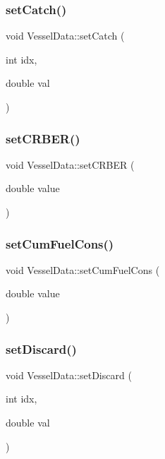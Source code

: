 \mbox{\label{class_vessel_data_aed1a3ec8e7eae38dd0f384b94a47147b}} 
\subsubsection{\texorpdfstring{setCatch()}{setCatch()}}
{\footnotesize\ttfamily void Vessel\+Data\+::set\+Catch (\begin{DoxyParamCaption}\item[{int}]{idx,  }\item[{double}]{val }\end{DoxyParamCaption})}

\mbox{\label{class_vessel_data_a07ae8da4d91f9839f348bd7996aba7c9}} 
\subsubsection{\texorpdfstring{setCRBER()}{setCRBER()}}
{\footnotesize\ttfamily void Vessel\+Data\+::set\+C\+R\+B\+ER (\begin{DoxyParamCaption}\item[{double}]{value }\end{DoxyParamCaption})}

\mbox{\label{class_vessel_data_a73f432263d3c69ee879232b8208dfd69}} 
\subsubsection{\texorpdfstring{setCumFuelCons()}{setCumFuelCons()}}
{\footnotesize\ttfamily void Vessel\+Data\+::set\+Cum\+Fuel\+Cons (\begin{DoxyParamCaption}\item[{double}]{value }\end{DoxyParamCaption})}

\mbox{\label{class_vessel_data_ad452b1f11f927a309b3a955b61b24151}} 
\subsubsection{\texorpdfstring{setDiscard()}{setDiscard()}}
{\footnotesize\ttfamily void Vessel\+Data\+::set\+Discard (\begin{DoxyParamCaption}\item[{int}]{idx,  }\item[{double}]{val }\end{DoxyParamCaption})}

